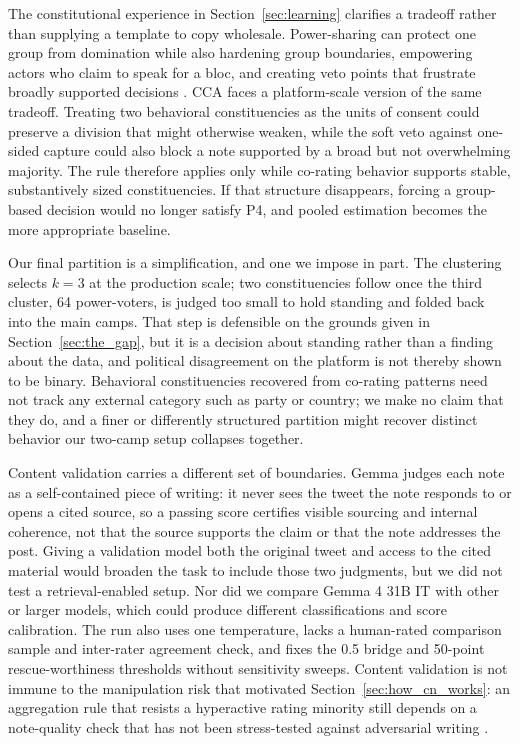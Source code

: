 \documentclass[10pt,twocolumn]{article}
\begin{document}
The constitutional experience in Section~\ref{sec:learning} clarifies a
tradeoff rather than supplying a template to copy wholesale. Power-sharing can
protect one group from domination while also hardening group boundaries,
empowering actors who claim to speak for a bloc, and creating veto points that
frustrate broadly supported decisions
\citep{mcgarryoleary2009,schwartz2010,mcculloch2025}. CCA faces a platform-scale
version of the same tradeoff. Treating two behavioral constituencies as the
units of consent could preserve a division that might otherwise weaken, while
the soft veto against one-sided capture could also block a note supported by a
broad but not overwhelming majority. The rule therefore applies only while
co-rating behavior supports stable, substantively sized constituencies. If that
structure disappears, forcing a group-based decision would no longer satisfy
P4, and pooled estimation becomes the more appropriate baseline.

Our final partition is a simplification, and one we impose in part. The
clustering selects $k=3$ at the production scale; two constituencies follow
once the third cluster, 64 power-voters, is judged too small to hold standing
and folded back into the main camps. That step is defensible on the grounds
given in Section~\ref{sec:the_gap}, but it is a decision about standing rather
than a finding about the data, and political disagreement on the platform is
not thereby shown to be binary.
Behavioral constituencies recovered from co-rating patterns need not track
any external category such as party or country; we make no claim that they
do, and a finer or differently structured partition might recover distinct
behavior our two-camp setup collapses together.

Content validation carries a different set of boundaries. Gemma judges each
note as a self-contained piece of writing: it never sees the tweet the note
responds to or opens a cited source, so a passing score certifies visible
sourcing and internal coherence, not that the source supports the claim or
that the note addresses the post. Giving a validation model both the original
tweet and access to the cited material would broaden the task to include those
two judgments, but we did not test a retrieval-enabled setup. Nor did we
compare Gemma 4 31B IT with other or larger models, which could produce
different classifications and score calibration. The run also uses one
temperature, lacks a human-rated comparison sample and inter-rater agreement
check, and fixes the 0.5 bridge and 50-point rescue-worthiness thresholds
without sensitivity sweeps. Content validation is not immune to the
manipulation risk that motivated Section~\ref{sec:how_cn_works}: an aggregation
rule that resists a hyperactive rating minority still depends on a note-quality
check that has not been stress-tested against adversarial writing
\citep{truong2025vulnerable}.
\end{document}
